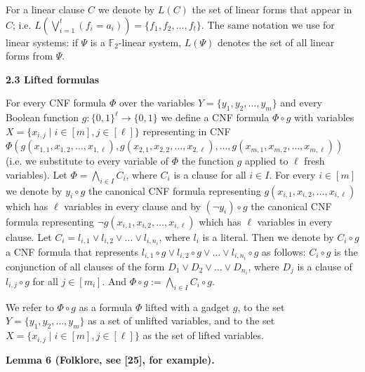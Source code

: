 \documentclass[10pt,a4paper]{article}
\begin{document}
For a linear clause $C$ we denote by $L(C)$ the set of linear forms that appear in $C$;
i.e. $L\left(\bigvee_{i=1}^{t}(f_{i}=a_{i})\right)=\{f_{1},f_{2},\dots,f_{t}\}$.
The same notation we use for linear systems: if $\Psi$ is a $\mathbb{F}_{2}$-linear system,
$L(\Psi)$ denotes the set of all linear forms from $\Psi$.\par


\par\medskip\noindent\textbf{
2.3 Lifted formulas}\par


For every CNF formula $\Phi$ over the variables $Y=\{y_{1},y_{2},\dots,y_{m}\}$ and every
Boolean function $g\colon\{0,1\}^{\ell}\to\{0,1\}$ we define a CNF formula
$\Phi\circ g$ with variables
$X=\{x_{i,j}\mid i\in[m],j\in[\ell]\}$ representing in CNF
$\Phi(g(x_{1,1},x_{1,2},\dots,x_{1,\ell}),g(x_{2,1},x_{2,2},\dots,x_{2,\ell}),\dots,g(x_{m,1},x_{m,2},\dots,x_{m,\ell}))$
(i.e. we substitute to every variable of $\Phi$ the function $g$ applied to $\ell$ fresh variables).
Let $\Phi=\bigwedge\limits_{i\in I}C_{i}$, where $C_{i}$ is a clause for all $i\in I$.
For every $i\in[m]$ we denote by $y_{i}\circ g$ the canonical CNF formula representing
$g(x_{i,1},x_{i,2},\dots,x_{i,\ell})$ which has $\ell$ variables in every clause and by
$(\lnot y_{i})\circ g$ the canonical CNF formula representing $\lnot g(x_{i,1},x_{i,2},\dots,x_{i,\ell})$
which has $\ell$ variables in every clause.
Let $C_{i}=l_{i,1}\lor l_{i,2}\lor\dots\lor l_{i,n_{i}}$, where $l_{i}$
is a literal. Then we denote by $C_{i}\circ g$ a CNF formula that represents $l_{i,1}\circ g\lor l_{i,2}\circ g\lor\dots\lor l_{i,n_{i}}\circ g$ as follows: $C_{i}\circ g$ is the conjunction of all clauses of the form $D_{1}\lor D_{2}\lor\dots\lor D_{n_{i}}$, where $D_{j}$ is a clause of $l_{i,j}\circ g$ for all $j\in[m_{i}]$.
And $\Phi\circ g:=\bigwedge\limits_{i\in I}C_{i}\circ g$.\par



We refer to $\Phi\circ g$ as a formula $\Phi$ lifted with a gadget $g$,
to the set $Y=\{y_{1},y_{2},\dots,y_{m}\}$ as a set of unlifted variables,
and to the set $X=\{x_{i,j}\mid i\in[m],j\in[\ell]\}$ as the set of lifted variables.\par



\par\medskip\noindent\textbf{
Lemma 6 (Folklore, see [25], for example).
}\par
\end{document}
